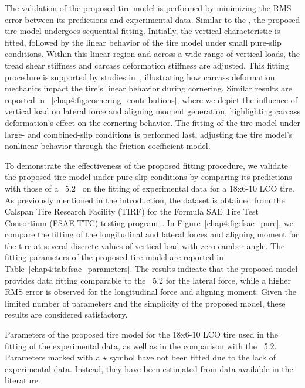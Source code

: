 The validation of the proposed tire model is performed by minimizing the \ac{RMS} error between its predictions and experimental data. Similar to the \MagicFormulae{}, the proposed tire model undergoes sequential fitting. Initially, the vertical characteristic is fitted, followed by the linear behavior of the tire model under small pure-slip conditions. Within this linear region and across a wide range of vertical loads, the tread shear stiffness and carcass deformation stiffness are adjusted. This fitting procedure is supported by studies in~\cite{miyashita2010tire, miyashita2003analytical, miyashita2006new, kabe2006new, miyashita2015study}, illustrating how carcass deformation mechanics impact the tire's linear behavior during cornering. Similar results are reported in \figurename~\ref{chap4:fig:cornering_contributions}, where we depict the influence of vertical load on lateral force and aligning moment generation, highlighting carcass deformation's effect on the cornering behavior. The fitting of the tire model under large- and combined-slip conditions is performed last, adjusting the tire model's nonlinear behavior through the friction coefficient model.

To demonstrate the effectiveness of the proposed fitting procedure, we validate the proposed tire model under pure slip conditions by comparing its predictions with those of a \MagicFormulae{}~5.2~\cite{pacejka2012tire} on the fitting of experimental data for a \Hoosier{} 18x6-10 LCO tire. As previously mentioned in the introduction, the dataset is obtained from the Calspan Tire Research Facility (TIRF) for the Formula SAE Tire Test Consortium (FSAE TTC) testing program~\cite{kasprzak2006formula}. In Figure~\ref{chap4:fig:fsae_pure}, we compare the fitting of the longitudinal and lateral forces and aligning moment for the \Hoosier{} tire at several discrete values of vertical load with zero camber angle. The fitting parameters of the proposed tire model are reported in Table~\ref{chap4:tab:fsae_parameters}. The results indicate that the proposed model provides data fitting comparable to the \MagicFormulae{}~5.2 for the lateral force, while a higher \ac{RMS} error is observed for the longitudinal force and aligning moment. Given the limited number of parameters and the simplicity of the proposed model, these results are considered satisfactory.

\begin{table}
  \caption{Parameters of the proposed tire model for the \Hoosier{} 18x6-10 LCO tire used in the fitting of the experimental data, as well as in the comparison with the \MagicFormulae{}~5.2. Parameters marked with a $\star$ symbol have not been fitted due to the lack of experimental data. Instead, they have been estimated from data available in the literature.}
  \label{chap4:tab:fsae_parameters}
  \small
  
\end{table}

